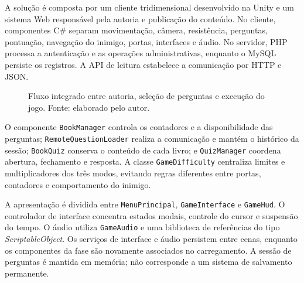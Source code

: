 \documentclass[12pt]{article}
\begin{document}
A solução é composta por um cliente tridimensional desenvolvido na Unity e um sistema Web responsável pela autoria e publicação do conteúdo. No cliente, componentes C\# separam movimentação, câmera, resistência, perguntas, pontuação, navegação do inimigo, portas, interfaces e áudio. No servidor, PHP processa a autenticação e as operações administrativas, enquanto o MySQL persiste os registros. A API de leitura estabelece a comunicação por HTTP e JSON.

\begin{figure}[H]
\centering
{}
\caption{Fluxo integrado entre autoria, seleção de perguntas e execução do jogo. Fonte: elaborado pelo autor.}
\label{fig:arquitetura}
\end{figure}

O componente \texttt{BookManager} controla os contadores e a disponibilidade das perguntas; \texttt{RemoteQuestionLoader} realiza a comunicação e mantém o histórico da sessão; \texttt{BookQuiz} conserva o conteúdo de cada livro; e \texttt{QuizManager} coordena abertura, fechamento e resposta. A classe \texttt{GameDifficulty} centraliza limites e multiplicadores dos três modos, evitando regras diferentes entre portas, contadores e comportamento do inimigo.

A apresentação é dividida entre \texttt{MenuPrincipal}, \texttt{GameInterface} e \texttt{GameHud}. O controlador de interface concentra estados modais, controle do cursor e suspensão do tempo. O áudio utiliza \texttt{GameAudio} e uma biblioteca de referências do tipo \textit{ScriptableObject}. Os serviços de interface e áudio persistem entre cenas, enquanto os componentes da fase são novamente associados no carregamento. A sessão de perguntas é mantida em memória; não corresponde a um sistema de salvamento permanente.
\end{document}
